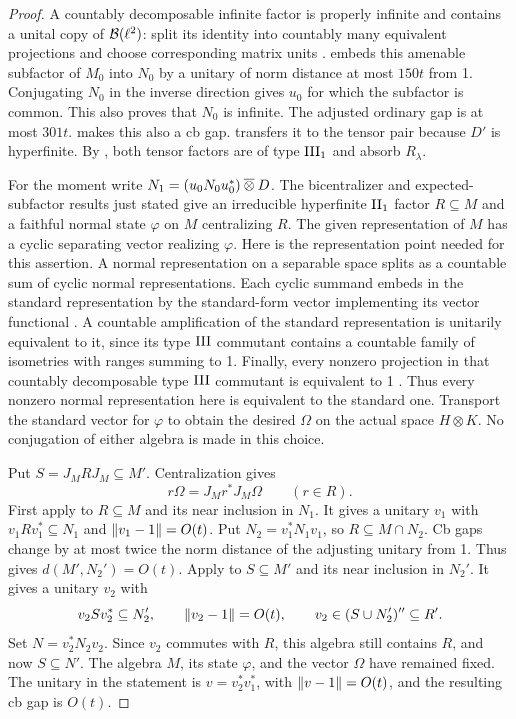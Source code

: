 \begin{proof}
A countably decomposable infinite factor is properly infinite and contains
a unital copy of $\mathcal B(\ell^2)$: split its identity into countably many
equivalent projections and choose corresponding matrix units
\cite[III.1.3.5 and III.1.5.1, pp.~243, 247]{BlackadarOperatorAlgebras}.
 embeds this amenable subfactor of $M_0$ into $N_0$
by a unitary of norm distance at most $150t$ from 1.  Conjugating $N_0$
in the inverse direction gives $u_0$ for which the subfactor is common.
This also proves that $N_0$ is infinite.
The adjusted ordinary gap is at most $301t$.
 makes this also a cb gap.
 transfers it to the tensor pair because $D'$ is
hyperfinite.  By , both tensor factors are
of type $\mathrm{III}_1$ and absorb $R_\lambda$.

For the moment write $N_1=(u_0N_0u_0^*)\mathbin{\overline\otimes} D$.  The
bicentralizer and expected-subfactor results just stated give an
irreducible hyperfinite $\mathrm{II}_1$ factor $R\subseteq M$ and a faithful
normal state $\varphi$ on $M$ centralizing $R$.
The given representation of $M$ has a cyclic separating vector realizing
$\varphi$.  Here is the representation point needed for this assertion.
A normal representation on a separable space splits as a countable sum
of cyclic normal representations.  Each cyclic summand embeds in the
standard representation by the standard-form vector implementing its
vector functional \cite[Lemma~2.10(1), p.~278]{Haagerup1975}.
A countable amplification of the standard
representation is unitarily equivalent to it, since its type $\mathrm{III}$
commutant contains a countable family of isometries with ranges summing
to 1.  Finally, every nonzero projection in that countably decomposable
type $\mathrm{III}$ commutant is equivalent to 1
\cite[Theorem~III.1.7.9]{BlackadarOperatorAlgebras}.  Thus every nonzero normal
representation here is equivalent to the standard one.  Transport the
standard vector for $\varphi$ to obtain the desired $\Omega$ on the
actual space $H\otimes K$.  No conjugation of either algebra is made in
this choice.

Put $S=J_MRJ_M\subseteq M'$.  Centralization gives
\begin{equation}
 r\Omega=J_Mr^*J_M\Omega\qquad(r\in R).
 \label{eq:common-central-vector}
\end{equation}
First apply  to $R\subseteq M$ and its near
inclusion in $N_1$.  It gives a unitary $v_1$ with
$v_1Rv_1^*\subseteq N_1$ and $\lVert v_1-1\rVert=O(t)$.  Put
$N_2=v_1^*N_1v_1$, so $R\subseteq M\cap N_2$.
Cb gaps change by at most twice the norm distance of the adjusting
unitary from 1.  Thus  gives
$d(M',N_2')=O(t)$.  Apply  to $S\subseteq M'$
and its near inclusion in $N_2'$.  It gives a unitary $v_2$ with
\[
 v_2Sv_2^*\subseteq N_2',\qquad
 \lVert v_2-1\rVert=O(t),\qquad
 v_2\in(S\cup N_2')''\subseteq R'.
\]
Set $N=v_2^*N_2v_2$.  Since $v_2$ commutes with $R$, this algebra
still contains $R$, and now $S\subseteq N'$.
The algebra $M$, its state $\varphi$, and the vector $\Omega$ have
remained fixed.  The unitary in the statement is $v=v_2^*v_1^*$,
with $\lVert v-1\rVert=O(t)$, and the resulting cb gap is $O(t)$.


\end{proof}
